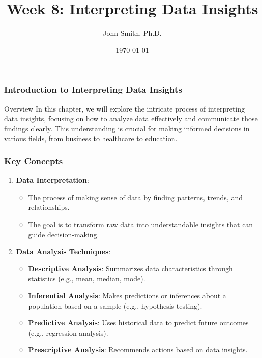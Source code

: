 \documentclass[aspectratio=169]{beamer}
\title[Interpreting Data Insights]{Week 8: Interpreting Data Insights}
\author[J. Smith]{John Smith, Ph.D.}
\institute[University Name]{
  Department of Data Science\\
  University Name\\
  \vspace{0.3cm}
  Email: email@university.edu\\
  Website: www.university.edu
}
\date{\today}
\begin{document}
\frame{\titlepage}

\begin{frame}[fragile]
    \frametitle{Introduction to Interpreting Data Insights}
    \begin{block}{Overview}
        In this chapter, we will explore the intricate process of interpreting data insights, focusing on how to analyze data effectively and communicate those findings clearly. This understanding is crucial for making informed decisions in various fields, from business to healthcare to education.
    \end{block}
\end{frame}

\begin{frame}[fragile]
    \frametitle{Key Concepts}
    \begin{enumerate}
        \item \textbf{Data Interpretation}:
            \begin{itemize}
                \item The process of making sense of data by finding patterns, trends, and relationships.
                \item The goal is to transform raw data into understandable insights that can guide decision-making.
            \end{itemize}
        
        \item \textbf{Data Analysis Techniques}:
            \begin{itemize}
                \item \textbf{Descriptive Analysis}: Summarizes data characteristics through statistics (e.g., mean, median, mode).
                \item \textbf{Inferential Analysis}: Makes predictions or inferences about a population based on a sample (e.g., hypothesis testing).
                \item \textbf{Predictive Analysis}: Uses historical data to predict future outcomes (e.g., regression analysis).
                \item \textbf{Prescriptive Analysis}: Recommends actions based on data insights.
            \end{itemize}
    \end{enumerate}
\end{frame}
\end{document}
